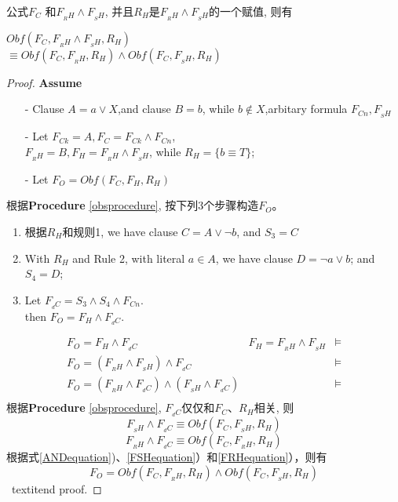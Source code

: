 \begin{lemma}\label{ANDrelation-Holding-Obfuscation}
公式$F_C$ 和$F_{_RH}\wedge F_{_SH}$,
并且$R_H$是$F_{_RH} \wedge F_{_SH}$的一个赋值, 则有

$Obf(F_C,F_{_RH} \wedge F_{_SH},R_H) $ \\
$\equiv Obf(F_C,F_{_RH},R_H) \wedge Obf(F_C,F_{_SH} ,R_H)$
\end{lemma}
\begin{proof}
 \textbf{Assume}
 \begin{enumerate}
 \item[-] Clause $A=a\vee X$,and clause $B=b$, while $b\notin X$,arbitary formula $F_{Cn},F_{_SH}$
 \item[-] Let $F_{Ck} =A, F_C=F_{Ck} \wedge F_{Cn}$, \\
           $F_{_RH}=B, F_H=F_{_RH}\wedge F_{_SH}$, while $R_H=\{b\equiv T\}$;
 \item[-] Let $F_O=Obf(F_C,F_H,R_H)$
 \end{enumerate}
 根据\textbf{Procedure} \ref{obsprocedure}, 按下列3个步骤构造$F_O$。
 \begin{enumerate}
 \item 根据$R_H$和规则1,
 we have clause $C=A\vee \neg b$, and $S_3=C$
 \item
 With $R_H$ and Rule 2,
 with literal $a\in A$,
 we have clause $D=\neg a\vee b$;
 and $S_4=D$;
 \item
 Let  $F_{_dC} =S_3\wedge S_4 \wedge F_{Cn}$.\\
 then $F_O=F_H \wedge F_{_dC}$.
 \end{enumerate}
 \begin{equation}\label{ANDequation}
 \begin{array}{ccc}
 F_O  =  F_H \wedge F_{_dC}                                     & F_H=F_{_RH}\wedge F_{_SH}&\models\\
 F_O  =  (F_{_RH}\wedge F_{_SH})\wedge F_{_dC}                   &                        &\models\\
 F_O  =  (F_{_RH} \wedge F_{_dC})\wedge (F_{_SH} \wedge F_{_dC})  &                        &\models\\
 \end{array}
 \end{equation}
 根据\textbf{Procedure} \ref{obsprocedure}, $F_{_dC}$仅仅和$F_C$、$R_H$相关, 则
\begin{equation}\label{FSHequation}
 F_{_SH} \wedge F_{_dC} \equiv Obf(F_C,F_{_SH},R_H)
\end{equation}
\begin{equation}\label{FRHequation}
 F_{_RH} \wedge F_{_dC} \equiv Obf(F_C,F_{_RH},R_H)
\end{equation}
根据式\ref{ANDequation})、\ref{FSHequation}）和\ref{FRHequation}），则有
\begin{equation}
 F_O  = Obf(F_C,F_{_RH},R_H)\wedge Obf(F_C,F_{_SH},R_H)
\end{equation}
\
textit{end proof.}
\end{proof}


